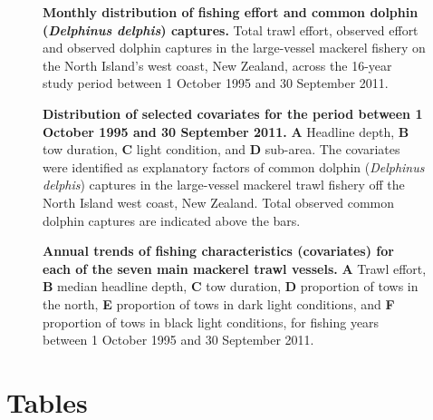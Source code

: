 \documentclass[10pt]{article}
\begin{document}
\begin{figure}[!ht]
\begin{center}

\end{center}
\caption{{\bf Monthly distribution of fishing effort and common dolphin (\emph{Delphinus delphis}) captures.}
Total trawl effort, observed effort and observed dolphin captures in the large-vessel mackerel fishery on the North Island's west coast, New Zealand, across the 16-year study period between   1 October 1995 and 30 September 2011.}
\label{fig-dolphin-months}
\end{figure}


\begin{figure}[!ht]
\begin{center}

\end{center} 
\caption{{\bf Distribution of selected covariates for the period
between 1 October 1995 and 30 September 2011.}  {\bf A} Headline
depth, {\bf B} tow duration, {\bf C} light condition, and {\bf D} sub-area. The covariates were identified as explanatory factors of common dolphin (\emph{Delphinus delphis}) captures in the large-vessel mackerel trawl fishery off the North Island west coast, New Zealand.  Total observed common dolphin captures are indicated above the bars.} 
\label{fig:covariate_distributions}
\end{figure}




\begin{figure}[!ht]
\begin{center}

\end{center}
\caption{{\bf Annual trends of fishing characteristics (covariates) for each of the seven main mackerel trawl vessels.} 
{\bf A} Trawl effort, {\bf B} median headline depth, {\bf C} tow duration, {\bf D} proportion of tows in the north, {\bf E} proportion of tows in dark light conditions, and {\bf F} proportion of tows in black light conditions, for fishing years between 1 October 1995 and 30 September 2011.}
\label{fig:seven-vessel-characteristics}
\end{figure}


\clearpage
\section*{Tables}
\end{document}
